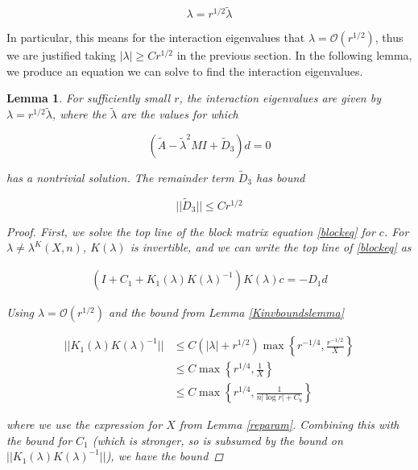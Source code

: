 \documentclass[12pt]{article}
\newtheorem{lemma}{Lemma}
\begin{document}
\[
\lambda = r^{1/2}\tilde{\lambda}
\]

In particular, this means for the interaction eigenvalues that $\lambda = \mathcal{O}(r^{1/2})$, thus we are justified taking $|\lambda| \geq C r^{1/2}$ in the previous section. In the following lemma, we produce an equation we can solve to find the interaction eigenvalues.


\begin{lemma}\label{deqlemma}
For sufficiently small $r$, the interaction eigenvalues are given by $\lambda = r^{1/2} \tilde{\lambda}$, where the $\tilde{\lambda}$ are the values for which

\begin{equation}\label{eqford}
(\tilde{A} - \tilde{\lambda}^2 MI + \tilde{D}_3)d = 0
\end{equation}

has a nontrivial solution. The remainder term $\tilde{D}_3$ has bound

\begin{equation}\label{tildeD3bound}
||\tilde{D}_3|| \leq C r^{1/2}
\end{equation}

\begin{proof}
First, we solve the top line of the block matrix equation \eqref{blockeq} for $c$. For $\lambda \neq \lambda^K(X, n)$, $K(\lambda)$ is invertible, and we can write the top line of \eqref{blockeq} as

\begin{align*}
(I + C_1 + K_1(\lambda)K(\lambda)^{-1}) K(\lambda) c = -D_1 d
\end{align*}

Using $\lambda = \mathcal{O}(r^{1/2})$ and the bound from Lemma \ref{Kinvboundslemma}

\begin{align*}
||K_1(\lambda)K(\lambda)^{-1}|| &\leq C (|\lambda| + r^{1/2})\max \left\{ r^{-1/4}, \frac{r^{-1/2}}{X} \right\} \\
&\leq C \max \left\{ r^{1/4}, \frac{1}{X} \right\} \\
&\leq C \max \left\{ r^{1/4}, \frac{1}{n |\log r| + C_b } \right\}
\end{align*}

where we use the expression for $X$ from Lemma \ref{reparam}. Combining this with the bound for $C_1$ (which is stronger, so is subsumed by the bound on $||K_1(\lambda)K(\lambda)^{-1}||$), we have the bound


\end{proof}
\end{lemma}
\end{document}
